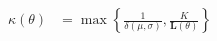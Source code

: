 \begin{equation}\label{eq:newCompressionRatio}
\begin{aligned}
\kappa(\theta) &= \max\left\{ \frac{1}{\delta(\mu,\sigma) }   , \frac{K}{\mathbf{L}(\theta)} \right\}   
\end{aligned}
\end{equation}



